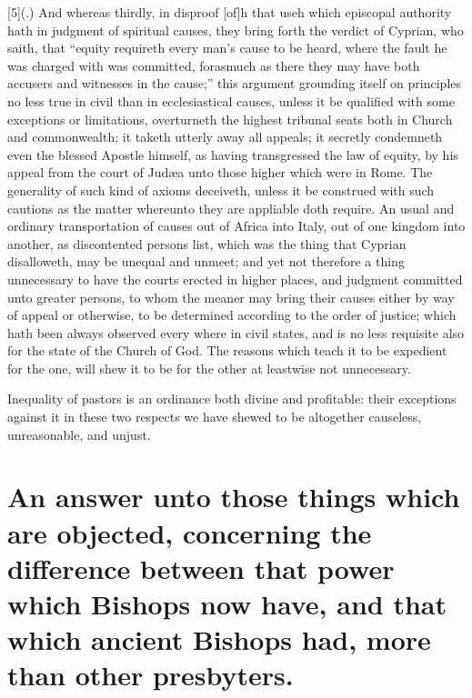 [5](.) And whereas thirdly, in disproof [of]h that useh which episcopal authority hath in judgment of spiritual causes, they bring forth the verdict of Cyprian, who saith, that “equity requireth every man’s cause to be heard, where the fault he was charged with was committed, forasmuch as there they may have both accusers and witnesses in the cause;” this argument grounding itself on principles no less true in civil than in ecclesiastical causes, unless it be qualified with some exceptions or limitations, overturneth the highest tribunal seats both in Church and commonwealth; it taketh utterly away all appeals; it secretly condemneth even the blessed Apostle himself, as having transgressed the law of equity, by his appeal from the court of Judæa unto those higher which were in Rome. The generality of such kind of axioms deceiveth, unless it be construed with such cautions as the matter whereunto they are appliable doth require. An usual and ordinary transportation of causes out of Africa into Italy, out of one kingdom into another, as discontented persons list, which was the thing that Cyprian disalloweth, may be unequal and unmeet; and yet not therefore a thing unnecessary to have the courts erected in higher places, and judgment committed unto greater persons, to whom the meaner may bring their causes either by way of appeal or otherwise, to be determined according to the order of justice; which hath been always observed every where in civil states, and is no less requisite also for the state of the  Church of God. The reasons which teach it to be expedient for the one, will shew it to be for the other at leastwise not unnecessary.

Inequality of pastors is an ordinance both divine and profitable: their exceptions against it in these two respects we have shewed to be altogether causeless, unreasonable, and unjust.

\section*{An answer unto those things which are objected, concerning the difference between that power which Bishops now have, and that which ancient Bishops had, more than other presbyters.}


